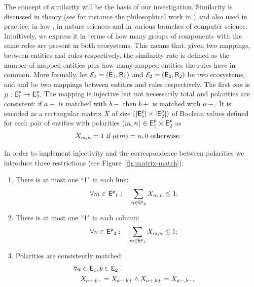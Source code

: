 \documentclass[a4paper,twoside]{article}
\begin{document}
The concept of similarity will be the basis of our investigation.
Similarity  is discussed in theory (see for instance the philosophical work in \cite{tversky}) and also used in practice: in law \cite{Mooiman}, in nature sciences \cite{bbw090} and in 
various branches of computer science. 
Intuitively, we express it in terms of how many  groups of components with the same roles are present in both ecosystems.
This means that, given two mappings, between entities and rules respectively, 
the similarity rate is defined as the number of mapped entities plus how many mapped entities the rules have in common. 
More formally, let $\mathcal{E}_1 = (\mathsf{E}_1, \mathsf{R}_1)$ and $\mathcal{E}_2 =
(\mathsf{E}_2, \mathsf{R}_2)$ be two ecosystems, and \mapcomp and \maprule be two mappings between entities and rules respectively.
The first one is $\mu : \mathsf{E}^p_1 \to \mathsf{E}^p_2.$
The mapping \mapcomp is injective but not necessarily total and polarities are consistent: \ie if $a+$ is matched with $b-$ then $b+$ is matched with $a-$. It is encoded as a rectangular matrix $X$  of size $(|\mathsf{E}^p_1| \times |\mathsf{E}^p_2|)$ of Boolean values defined for each pair of entities with polarities $(m,n) \in \mathsf{E}^p_1 \times \mathsf{E}^p_2$ as
$$X_{m,n} = 1 \text{ if } \mu(m)=n, 0 \text{ otherwise.} $$

In order to implement  injectivity and the correspondence between polarities we introduce three restrictions (see Figure~\ref{fig:matrix-match}): 
\begin{enumerate}
\item There is at most one ``1" in  each line:~ 
$$
\forall m \in \mathsf{E^p}_1: \quad
   \sum_{n \in \mathsf{E^p}_2} X_{m,n}  \leq 1;
  $$
  
 \item There is at most one ``1" in  each column:~  
$$
\forall n \in \mathsf{E^p}_2: \quad
   \sum_{m \in \mathsf{E^p}_1} X_{m,n}  \leq 1;
  $$
 \item Polarities are consistently matched: 
\begin{align*}
 &\forall a \in \mathsf{E}_1, b \in \mathsf{E}_2: \\
  & \quad X_{a+,b-} = X_{a-,b+} \land X_{a+,b+} = X_{a-,b-} .
\end{align*}
\end{enumerate}
\end{document}
